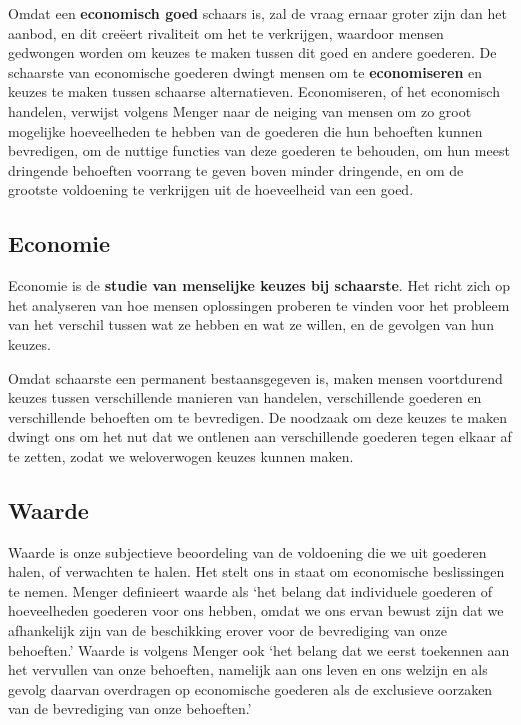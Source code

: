 Omdat een \textbf{economisch goed} schaars is, zal de vraag ernaar groter zijn dan het aanbod, en dit creëert rivaliteit om het te verkrijgen, waardoor mensen gedwongen worden om keuzes te maken tussen dit goed en andere goederen. De schaarste van economische goederen dwingt mensen om te \textbf{economiseren} en keuzes te maken tussen schaarse alternatieven. Economiseren, of het economisch handelen, verwijst volgens Menger naar de neiging van mensen om zo groot mogelijke hoeveelheden te hebben van de goederen die hun behoeften kunnen bevredigen, om de nuttige functies van deze goederen te behouden, om hun meest dringende behoeften voorrang te geven boven minder dringende, en om de grootste voldoening te verkrijgen uit de hoeveelheid van een goed.

\subsection{Economie}

Economie is de \textbf{studie van menselijke keuzes bij schaarste}. Het richt zich op het analyseren van hoe mensen oplossingen proberen te vinden voor het probleem van het verschil tussen wat ze hebben en wat ze willen, en de gevolgen van hun keuzes. 

Omdat schaarste een permanent bestaansgegeven is, maken mensen voortdurend keuzes tussen verschillende manieren van handelen, verschillende goederen en verschillende behoeften om te bevredigen. De noodzaak om deze keuzes te maken dwingt ons om het nut dat we ontlenen aan verschillende goederen tegen elkaar af te zetten, zodat we weloverwogen keuzes kunnen maken.

\subsection{Waarde}

Waarde is onze subjectieve beoordeling van de voldoening die we uit goederen halen, of verwachten te halen. Het stelt ons in staat om economische beslissingen te nemen. Menger definieert waarde als `het belang dat individuele goederen of hoeveelheden goederen voor ons hebben, omdat we ons ervan bewust zijn dat we afhankelijk zijn van de beschikking erover voor de bevrediging van onze behoeften.'\autocite{15} Waarde is volgens Menger ook `het belang dat we eerst toekennen aan het vervullen van onze behoeften, namelijk aan ons leven en ons welzijn en als gevolg daarvan overdragen op economische goederen als de exclusieve oorzaken van de bevrediging van onze behoeften.'\autocite{16}

